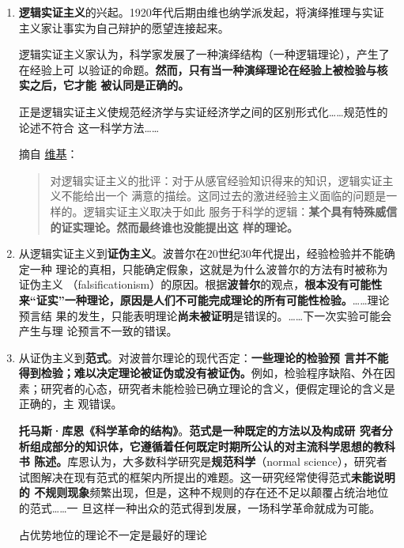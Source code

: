 \begin{enumerate}
\item \textbf{逻辑实证主义}的兴起。1920年代后期由维也纳学派发起，将演绎推理与实证
  主义家让事实为自己辩护的愿望连接起来。

  逻辑实证主义家认为，科学家发展了一种演绎结构（一种逻辑理论），产生了在经验上可
  以验证的命题。\textbf{然而，只有当一种演绎理论在经验上被检验与核实之后，它才能
    被认同是正确的。}

  正是逻辑实证主义使规范经济学与实证经济学之间的区别形式化……规范性的论述不符合
  这一科学方法……

摘自
\href{https://zh.wikipedia.org/wiki/%E9%80%BB%E8%BE%91%E5%AE%9E%E8%AF%81%E4%B8%BB%E4%B9%89}{维基}：
  \begin{quotation}
    对逻辑实证主义的批评：对于从感官经验知识得来的知识，逻辑实证主义不能给出一个
    满意的描绘。这同过去的激进经验主义面临的问题是一样的。逻辑实证主义取决于如此
    服务于科学的逻辑：\textbf{某个具有特殊威信的证实理论。然而最终谁也没能提出这
      样的理论。}
  \end{quotation}


\item 从逻辑实证主义到\textbf{证伪主义}。波普尔在20世纪30年代提出，经验检验并不能确定一种
  理论的真相，只能确定假象，这就是为什么波普尔的方法有时被称为证伪主义
  （falsificationism）的原因。根据\textbf{波普尔}的观点，\textbf{根本没有可能性
    来“证实”一种理论，原因是人们不可能完成理论的所有可能性检验。}……理论预言结
  果的发生，只能表明理论\textbf{尚未被证明}是错误的。……下一次实验可能会产生与理
  论预言不一致的错误。

\item 从证伪主义到\textbf{范式}。对波普尔理论的现代否定：\textbf{一些理论的检验预
    言并不能得到检验；难以决定理论被证伪或没有被证伪。}例如，检验程序缺陷、外在因
  素；研究者的心态，研究者未能检验已确立理论的含义，便假定理论的含义是正确的，主
  观错误。

  \textbf{托马斯·库恩《科学革命的结构》}。\textbf{范式是一种既定的方法以及构成研
    究者分析组成部分的知识体，它遵循着任何既定时期所公认的对主流科学思想的教科书
    陈述。}库恩认为，大多数科学研究是\textbf{规范科学}（normal science），研究者
  试图解决在现有范式的框架内所提出的难题。这一研究经常使得范式\textbf{未能说明的
    不规则现象}频繁出现，但是，这种不规则的存在还不足以颠覆占统治地位的范式……一
  旦这样一种出众的范式得到发展，一场科学革命就成为可能。

  占优势地位的理论不一定是最好的理论


\end{enumerate}
